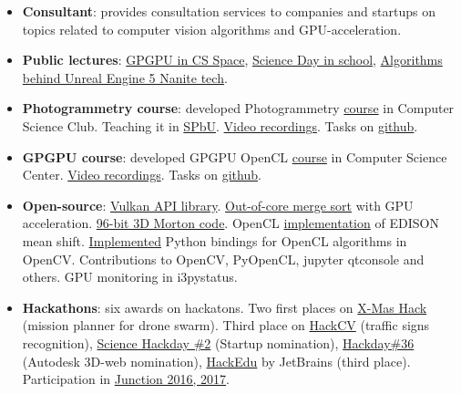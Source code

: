 \documentclass[11pt,oneside]{article}
\newcommand{\hhref}[2]{\href{#1}{\color{blue}#2}}
\begin{document}
\begin{itemize}
    \item{\textbf{Consultant}}: provides consultation services to companies and startups on topics related to computer vision algorithms and GPU-acceleration.

    \item{\textbf{Public lectures}}: \hhref{https://csspace.io/open-lecture/2025-gpu}{GPGPU in CS Space}, \hhref{https://www.youtube.com/watch?v=adQQoH3iXPQ}{Science Day in school}, \hhref{https://www.youtube.com/watch?v=ltUzX1IR9JI&list=PL5p-5hHpsHBolSeDn7__1c9hgPprYTjnn&index=3}{Algorithms behind Unreal Engine 5 Nanite tech}.

    \item{\textbf{Photogrammetry course}}: developed Photogrammetry  \hhref{https://compsciclub.ru/courses/photogrammetry/2021-spring/}{course} in Computer Science Club. Teaching it in \hhref{https://math-cs.spbu.ru/}{SPbU}.  \hhref{https://www.youtube.com/@polarnick239/playlists}{Video recordings}. Tasks on \hhref{https://github.com/PhotogrammetryCourse/}{github}.

    \item{\textbf{GPGPU course}}: developed GPGPU OpenCL \hhref{https://compscicenter.ru/courses/video_cards_computation/}{course} in Computer Science Center. \hhref{https://www.youtube.com/watch?v=L79PgDOcVfw&list=PLlb7e2G7aSpTgwAm0GBkvn5XA0NokovJJ}{Video recordings}. Tasks on \hhref{https://github.com/GPGPUCourse/}{github}.

    \item{\textbf{Open-source}: \hhref{https://github.com/GPGPUCourse/GPGPUVulkan}{Vulkan API library}. \hhref{https://github.com/PolarNick239/ExternalSortingOnGPU}{Out-of-core merge sort} with GPU acceleration. \hhref{https://gist.github.com/PolarNick239/7819fb7722fab09b37ecaee77c82cf58}{96-bit 3D Morton code}. OpenCL \hhref{https://github.com/PolarNick239/OpenMeanShift}{implementation} of EDISON mean shift. \hhref{https://github.com/opencv/opencv/pull/6078}{Implemented} Python bindings for OpenCL algorithms in OpenCV. Contributions to OpenCV, PyOpenCL, jupyter qtconsole and others. GPU monitoring in i3pystatus.}

    \item{\textbf{Hackathons}}: six awards on hackatons. Two first places on \hhref{https://github.com/PolarNick239/HackathonDroneSwarm}{X-Mas Hack} (mission planner for drone swarm). Third place on \hhref{https://career.luxoft.com/lp/hack-cv/}{HackCV} (traffic signs recognition), \hhref{http://hackday.ru/sciencehackday-2/projects\#project-1400}{Science Hackday \#2} (Startup nomination), \hhref{http://hackday.ru/hackday-36/projects\#project-1121}{Hackday\#36} (Autodesk 3D-web nomination), \hhref{https://www.hackerleague.org/hackathons/jetbrains-edtech-hackathon/blogposts/53655896e24d32cfbd000006}{HackEdu} by JetBrains (third place). Participation in \hhref{http://www.hackjunction.com/}{Junction 2016, 2017}.


\end{itemize}
\end{document}
